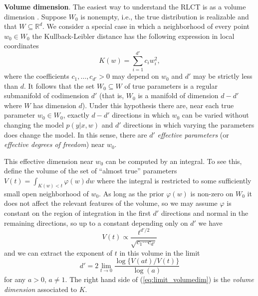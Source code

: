 \documentclass{article} %
\def\be{\begin{equation}}
\def\ee{\end{equation}}
\begin{document}
\textbf{Volume dimension}. The easiest way to understand the RLCT is as a volume dimension \citep[Theorem 7.1]{watanabe_algebraic_2009}.  Suppose $W_0$ is nonempty, i.e., the true distribution is realizable and that $W \subseteq \mathbb{R}^d$. We consider a special case in which a neighborhood of every point $w_0 \in W_0$ the Kullback-Leibler distance has the following expression in local coordinates
\begin{equation}\label{eq:local_Kw}
K(w) = \sum_{i=1}^{d'} c_i w_i^2,
\end{equation} %
where the coefficients $c_1,\ldots,c_{d'} > 0$ may depend on $w_0$ and $d'$ may be strictly less than $d$. It follows that the set $W_0 \subseteq W$ of true parameters is a regular submanifold of codimension $d'$ (that is, $W_0$ is a manifold of dimension $d - d'$ where $W$ has dimension $d$). Under this hypothesis there are, near each true parameter $w_0 \in W_0$, exactly $d - d'$ directions in which $w_0$ can be varied without changing the model $p(y|x,w)$ and $d'$ directions in which varying the parameters does change the model. In this sense, there are $d'$ \emph{effective parameters} (or \emph{effective degrees of freedom}) near $w_0$. 

This effective dimension near $w_0$ can be computed by an integral. To see this, define the volume of the set of ``almost true'' parameters
$
V(t) = \int_{K(w) < t} \varphi(w) dw
$
where the integral is restricted to some sufficiently small open neighborhood of $w_0$. As long as the prior $\varphi(w)$ is non-zero on $W_0$ it does not affect the relevant features of the volume, so we may assume $\varphi$ is constant on the region of integration in the first $d'$ directions and normal in the remaining directions, so up to a constant depending only on $d'$ we have
\begin{equation}\label{eq:volume_singular}
V(t) \propto \frac{t^{d'/2}}{\sqrt{c_1 \cdots c_{d'}}}
\end{equation}
and we can extract the exponent of $t$ in this volume in the limit
\be\label{eq:limit_volumedim}
d' = 2 \lim_{t \to 0} \frac{\log\big\{V(at)/V(t)\big\}}{\log(a)}
\ee
for any $a > 0$, $a \neq 1$. The right hand side of (\ref{eq:limit_volumedim}) is the \emph{volume dimension} associated to $K$. 
\end{document}
